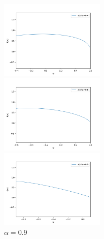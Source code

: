 \documentclass[a4paper,pdflatex,ja=standard]{bxjsarticle}
\begin{document}
\begin{enumerate}
\end{enumerate}

\begin{figure}[ht]
  \begin{minipage}{0.33\hsize}
   \begin{center}
    \includegraphics[width=50mm]{temp/0.4.png}
   \end{center}
   \caption{$\alpha=0.4$}
  \end{minipage}
  \begin{minipage}{0.33\hsize}
  \begin{center}
   \includegraphics[width=50mm]{temp/0.6.png}
  \end{center}
   \caption{$\alpha=0.6$}
  \end{minipage}
  \begin{minipage}{0.33\hsize}
  \begin{center}
   \includegraphics[width=50mm]{temp/0.9.png}
  \end{center}
   \caption{$\alpha=0.9$}
  \end{minipage}
 \end{figure}
\end{document}
